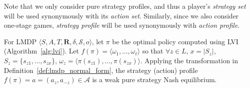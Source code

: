 Note that we only consider pure strategy profiles, and thus a player's \emph{strategy set} will be used synonymously with its \emph{action set}. Similarly, since we also consider one-stage games, \emph{strategy profile} will be used synonymously with \emph{action profile}.
\begin{proposition}
    \label{prop:lvi_nash}
    For LMDP $\langle S, A, T, \mathbf{R}, \delta, \mathcal{S}, o \rangle$, let $\pi$ be the optimal policy computed using LVI (Algorithm~\ref{alg:lvi}). Let $f(\pi) = \langle \omega_1, \ldots, \omega_\ell \rangle$ so that $\forall z \in L$, $x = |S_z|$, $S_z = \{ s_{z1}, \ldots, s_{zx} \}$, $\omega_z = \langle \pi(s_{z1}), \ldots, \pi(s_{zx}) \rangle$. Applying the transformation in Definition~\ref{def:lmdp_normal_form}, the strategy (action) profile $f(\pi) = a = (a_z, a_{-z}) \in \mathcal{A}$ is a weak pure strategy Nash equilibrium.
\end{proposition}

